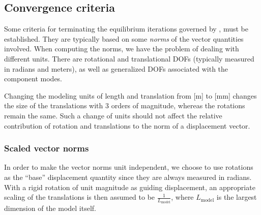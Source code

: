 %
%

%
%

\subsection{Convergence criteria}
\label{subs:Convergence criteria}

Some criteria for terminating the equilibrium iterations governed by
, must be established.
They are typically based on some {\it norms} of the vector quantities involved.
When computing the norms, we have the problem of dealing with different units.
There are rotational and translational DOFs (typically measured in radians and
meters), as well as generalized DOFs associated with the component modes.

Changing the modeling units of length and translation from [m] to [mm] changes
the size of the translations with 3 orders of magnitude, whereas the rotations
remain the same.
Such a change of units should not affect the relative contribution of rotation
and translations to the norm of a displacement vector.

\subsubsection{Scaled vector norms}

In order to make the vector norms unit independent, we choose to use rotations
as the ``base'' displacement quantity since they are always measured in radians.
With a rigid rotation of unit magnitude as guiding displacement, an appropriate
scaling of the translations is then assumed to be $\frac{1}{L_\text{model}}$,
where $L_\text{model}$ is the largest dimension of the model itself.

